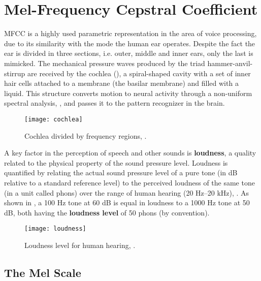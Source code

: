 \section{Mel-Frequency Cepstral Coefficient}

MFCC is a highly used parametric representation in the area of voice processing, due to its similarity with the mode the human ear operates. Despite the fact the ear is divided in three sections, i.e. outer, middle and inner ears, only the last is mimicked. The mechanical pressure waves produced by the triad hammer-anvil-stirrup are received by the cochlea (), a spiral-shaped cavity with a set of inner hair cells attached to a membrane (the basilar membrane) and filled with a liquid. This structure converts motion to neural activity through a non-uniform spectral analysis, , and passes it to the pattern recognizer in the brain.

\begin{figure}[ht]
    \centering
    \texttt{[image: cochlea]}
    \caption{Cochlea divided by frequency regions, .}
    \label{fig:cochlea}
\end{figure}

A key factor in the perception of speech and other sounds is \textbf{loudness}, a quality related to the physical property of the sound pressure level. Loudness is quantified by relating the actual sound pressure level of a pure tone (in dB relative to a standard reference level) to the perceived loudness of the same tone (in a unit called phons) over the range of human hearing (20 Hz–20 kHz), . As shown in , a 100 Hz tone at 60 dB is equal in loudness to a 1000 Hz tone at 50 dB, both having the \textbf{loudness level} of 50 phons (by convention).

\begin{figure}[ht]
    \centering
    \texttt{[image: loudness]}
    \caption{Loudness level for human hearing, .}
    \label{fig:loudness}
\end{figure}

\subsection{The Mel Scale}

